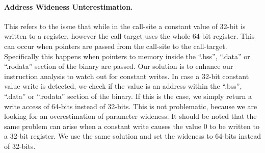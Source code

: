 \paragraph{Address Wideness Unterestimation.} This refers to the issue that while in the call-site a constant value of 32-bit is written to a register, however 
the call-target uses the whole 64-bit register. This can occur when pointers are passed from the call-site to the call-target. Specifically this happens 
when pointers to memory inside the ``.bss'', ``.data'' or ``.rodata'' section of the binary are passed.
Our solution is to enhance our instruction analysis to watch out for constant writes. In case a 32-bit constant value write is detected, we check if the
value is an address within the ``.bss'', ``.data'' or ``.rodata'' section of the binary. If this is the case, we simply return a write access of 64-bits 
instead of 32-bits. This is not problematic, because we are looking for an overestimation of parameter wideness.
It should be noted that the same problem can arise when a constant write causes the value 0 to be written to a 32-bit register. We use the same solution
and set the wideness to 64-bits instead of 32-bits.
%
%
%
